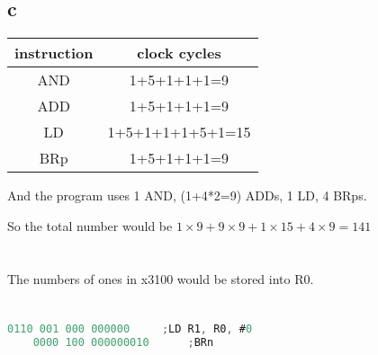\documentclass[11pt,a4paper]{article}
\begin{document}
	\subsection*{c}
	\begin{tabular}{|c|c|}
		\hline 
		instruction & clock cycles \\ 
		\hline 
		AND & 1+5+1+1+1=9 \\ 
		\hline 
		ADD & 1+5+1+1+1=9 \\ 
		\hline 
		LD & 1+5+1+1+1+5+1=15 \\ 
		\hline 
		BRp & 1+5+1+1+1=9 \\ 
		\hline 
	\end{tabular} \par
	And the program uses 1 AND, (1+4*2=9) ADDs, 1 LD, 4 BRps.\par
	So the total number would be \underline{$1\times 9+9\times 9+1\times 15+4\times 9=141$}

	\section{}
	The numbers of ones in x3100 would be stored into R0.
	
	\section{}
	\begin{lstlisting}[language=C]
	0110 001 000 000000		;LD R1, R0, #0
	0000 100 000000010		;BRn
	\end{lstlisting}
	
	
	
	
		
\end{document}
